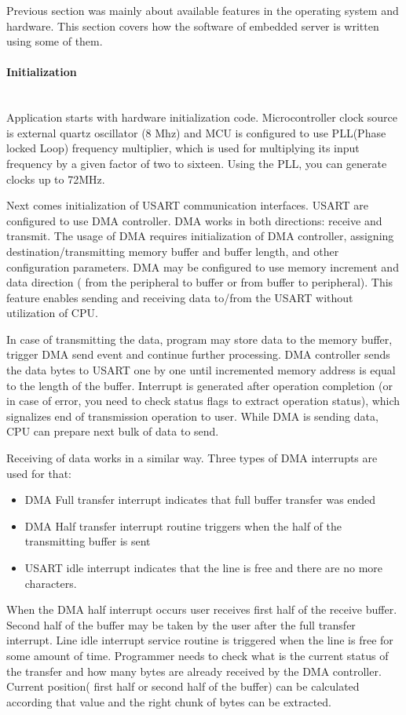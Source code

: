 Previous section was mainly about available features in the operating system and
hardware. 
This section covers how the software of embedded server is written
using some of them.

\paragraph{Initialization} ~\\
Application starts with hardware initialization code. Microcontroller clock
source is external quartz oscillator (8 Mhz) and MCU is configured to use 
PLL(Phase locked Loop) frequency multiplier,  which is used for multiplying its
input frequency by a given factor of two to sixteen. 
Using the PLL, you can generate clocks up to 72MHz.

Next comes initialization of USART communication interfaces. USART are configured
to use \gls{DMA} controller. \gls{DMA} works in both directions: receive and
transmit. The usage of DMA requires initialization of DMA controller, assigning
destination/transmitting memory buffer and buffer length, and other configuration
parameters. DMA may be configured to use memory increment and data direction (
from the peripheral to buffer or from buffer to peripheral). This feature
enables sending and receiving data to/from the USART without utilization of
CPU.

In case of transmitting the data, program may store data to the memory
buffer, trigger DMA send event and continue further processing. DMA controller
sends the data bytes to USART one by one until incremented memory address is
equal to the length of the buffer. Interrupt is generated after operation
completion (or in case of error, you need to check status flags to extract
operation status), which signalizes end of transmission operation to user.
While DMA is sending data, CPU can prepare next bulk of data to send.

Receiving of data works in a similar way.
Three types of DMA interrupts are used for that:
\begin{itemize}
  \item DMA Full transfer interrupt indicates that full buffer transfer was
  ended
  \item DMA Half transfer interrupt routine triggers when the half of the
  transmitting buffer is sent
  \item USART idle interrupt indicates that the
  line is free and there are no more characters.
\end{itemize}  
When the DMA half interrupt occurs user receives first half of the receive
buffer. Second half of the buffer may be taken by the user after the full
transfer interrupt. Line idle interrupt service routine is triggered when the
line is free for some amount of time. Programmer needs to check what is the
current status of the transfer and how many bytes are already received by the
DMA controller. Current position( first half or second half of the buffer) can
be calculated according that value and the right chunk of bytes can be
extracted.

